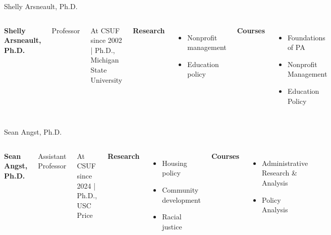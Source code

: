 \documentclass[10pt,aspectratio=169]{beamer}
\begin{document}
\begin{frame}{Shelly Arsneault, Ph.D.}
\begin{columns}[T,onlytextwidth]
    \raggedright
    {\large\bfseries Shelly Arsneault, Ph.D.}\par
    {Professor}\par
    {\footnotesize At CSUF since 2002 \quad | \quad Ph.D., Michigan State University}\par\vspace{0.4em}

    \textbf{Research}
    \begin{itemize}
      \item Nonprofit management
      \item Education policy
    \end{itemize}

    \textbf{Courses}
    \begin{itemize}
      \item Foundations of PA
      \item Nonprofit Management
      \item Education Policy
    \end{itemize}

    \vspace*{0.25cm}
\end{columns}
\end{frame}

\begin{frame}{Sean Angst, Ph.D.}
\begin{columns}[T,onlytextwidth]
    \raggedright
    {\large\bfseries Sean Angst, Ph.D.}\par
    {Assistant Professor}\par
    {\footnotesize At CSUF since 2024 \quad | \quad Ph.D., USC Price}\par\vspace{0.4em}

    \textbf{Research}
    \begin{itemize}
      \item Housing policy
      \item Community development
      \item Racial justice
    \end{itemize}

    \textbf{Courses}
    \begin{itemize}
      \item Administrative Research \& Analysis
      \item Policy Analysis
    \end{itemize}

    \vspace*{0.25cm}
\end{columns}
\end{frame}
\end{document}
